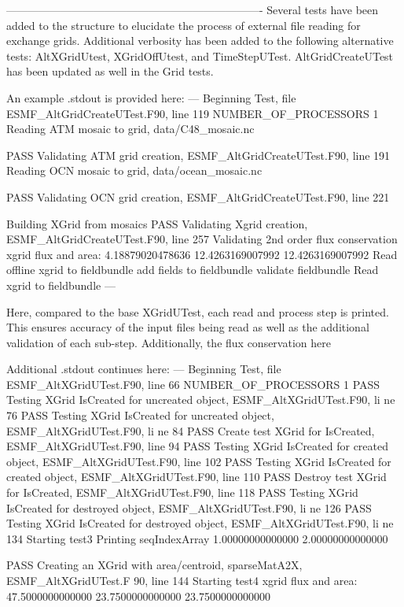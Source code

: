 
\label{sec:xgrid:Testing}
----------------------------------------------------------------------
Several tests have been added to the structure to elucidate the process of external file reading for
exchange grids. Additional verbosity has been added to the following alternative tests: AltXGridUtest,
 XGridOffUtest, and TimeStepUTest. AltGridCreateUTest has been updated as well in the Grid tests.

An example .stdout is provided here:
---
  Beginning Test, file ESMF_AltGridCreateUTest.F90, line 119
  NUMBER_OF_PROCESSORS           1
 Reading ATM mosaic to grid,
 data/C48_mosaic.nc

  PASS  Validating ATM grid creation, ESMF_AltGridCreateUTest.F90, line 191
 Reading OCN mosaic to grid,
 data/ocean_mosaic.nc

  PASS  Validating OCN grid creation, ESMF_AltGridCreateUTest.F90, line 221

 Building XGrid from mosaics
  PASS  Validating Xgrid creation, ESMF_AltGridCreateUTest.F90, line 257
 Validating 2nd order flux conservation
  xgrid flux and area:    4.18879020478636        12.4263169007992
   12.4263169007992
 Read offline xgrid to fieldbundle
 add fields to fieldbundle
 validate fieldbundle
 Read xgrid to fieldbundle
 ---

Here, compared to the base XGridUTest, each read and process step is printed. This ensures accuracy
of the input files being read as well as the additional validation of each sub-step. Additionally, the
flux conservation here 

Additional .stdout continues here:
---
  Beginning Test, file ESMF_AltXGridUTest.F90, line 66
  NUMBER_OF_PROCESSORS           1
  PASS  Testing XGrid IsCreated for uncreated object, ESMF_AltXGridUTest.F90, li
 ne 76
  PASS  Testing XGrid IsCreated for uncreated object, ESMF_AltXGridUTest.F90, li
 ne 84
  PASS  Create test XGrid for IsCreated, ESMF_AltXGridUTest.F90, line 94
  PASS  Testing XGrid IsCreated for created object, ESMF_AltXGridUTest.F90, line
  102
  PASS  Testing XGrid IsCreated for created object, ESMF_AltXGridUTest.F90, line
  110
  PASS  Destroy test XGrid for IsCreated, ESMF_AltXGridUTest.F90, line 118
  PASS  Testing XGrid IsCreated for destroyed object, ESMF_AltXGridUTest.F90, li
 ne 126
  PASS  Testing XGrid IsCreated for destroyed object, ESMF_AltXGridUTest.F90, li
 ne 134
 Starting test3
 Printing seqIndexArray    1.00000000000000        2.00000000000000

  PASS  Creating an XGrid with area/centroid, sparseMatA2X, ESMF_AltXGridUTest.F
 90, line 144
 Starting test4
  xgrid flux and area:    47.5000000000000        23.7500000000000
   23.7500000000000


